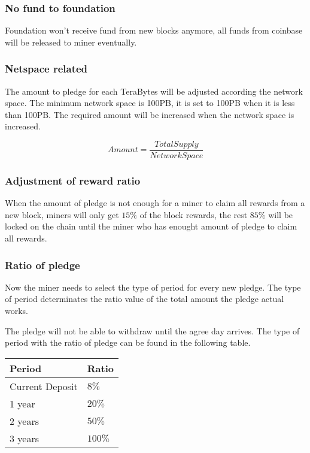 \subsubsection{No fund to foundation}
\begin{flushleft}
    Foundation won't receive fund from new blocks anymore, all funds from coinbase will be released to miner eventually.
\end{flushleft}
\subsubsection{Netspace related}
\begin{flushleft}
    The amount to pledge for each TeraBytes will be adjusted according the network space. The minimum network space is 100PB, it is set to 100PB when it is less than 100PB. The required amount will be increased when the network space is increased.
\end{flushleft}
\begin{equation}
    Amount = \frac{TotalSupply}{NetworkSpace}
\end{equation}
\subsubsection{Adjustment of reward ratio}
\begin{flushleft}
    When the amount of pledge is not enough for a miner to claim all rewards from a new block, miners will only get $15\%$ of the block rewards, the rest $85\%$ will be locked on the chain until the miner who has enought amount of pledge to claim all rewards.
\end{flushleft}
\subsubsection{Ratio of pledge}
\begin{flushleft}
    Now the miner needs to select the type of period for every new pledge. The type of period determinates the ratio value of the total amount the pledge actual works.
\end{flushleft}
\begin{flushleft}
    The pledge will not be able to withdraw until the agree day arrives. The type of period with the ratio of pledge can be found in the following table.
\end{flushleft}
\begin{tabular}{ |p{5cm}|p{3cm}| }
    \hline
    \rowcolor{lightgray}\textbf{Period} & \textbf{Ratio} \\[5pt]
    \hline
    Current Deposit & $8\%$ \\[5pt]
    \rowcolor{lightgray!30} 1 year & $20\%$ \\[5pt]
    2 years & $50\%$ \\[5pt]
    \rowcolor{lightgray!30} 3 years & $100\%$ \\[5pt]
    \hline
\end{tabular}

